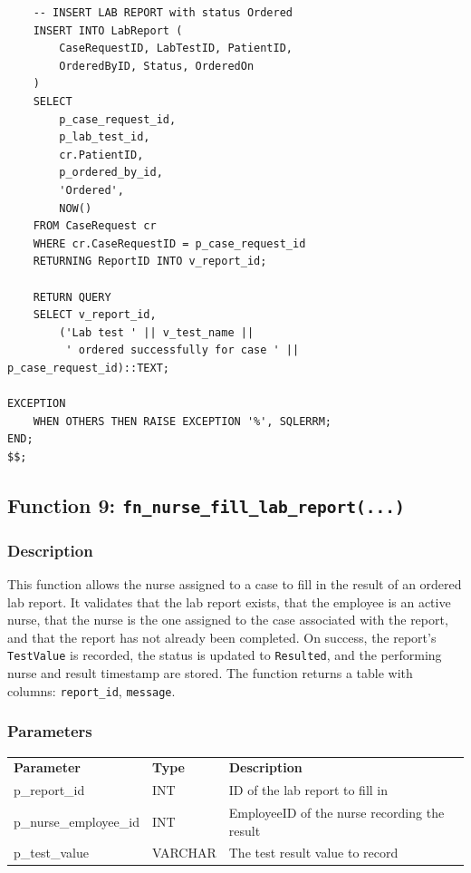\documentclass{article}
\newcommand{\theadcell}{\color{white}\bfseries}
\begin{document}
\begin{lstlisting}
    -- INSERT LAB REPORT with status Ordered
    INSERT INTO LabReport (
        CaseRequestID, LabTestID, PatientID,
        OrderedByID, Status, OrderedOn
    )
    SELECT
        p_case_request_id,
        p_lab_test_id,
        cr.PatientID,
        p_ordered_by_id,
        'Ordered',
        NOW()
    FROM CaseRequest cr
    WHERE cr.CaseRequestID = p_case_request_id
    RETURNING ReportID INTO v_report_id;

    RETURN QUERY
    SELECT v_report_id,
        ('Lab test ' || v_test_name ||
         ' ordered successfully for case ' || p_case_request_id)::TEXT;

EXCEPTION
    WHEN OTHERS THEN RAISE EXCEPTION '%', SQLERRM;
END;
$$;
\end{lstlisting}

\vspace{1em}

\subsection{Function 9: \texttt{fn\_nurse\_fill\_lab\_report(...)}}

\subsubsection{Description}
This function allows the nurse assigned to a case to fill in the result of an ordered lab report. It validates that the lab report exists, that the employee is an active nurse, that the nurse is the one assigned to the case associated with the report, and that the report has not already been completed. On success, the report's \texttt{TestValue} is recorded, the status is updated to \texttt{Resulted}, and the performing nurse and result timestamp are stored. The function returns a table with columns: \texttt{report\_id}, \texttt{message}.

\subsubsection{Parameters}

\begin{center}
\begin{tabular}{L{4.5cm} L{2.5cm} L{6.5cm}}
   \theadcell Parameter & \theadcell Type & \theadcell Description \\
   p\_report\_id         & INT     & ID of the lab report to fill in \\
   p\_nurse\_employee\_id & INT     & EmployeeID of the nurse recording the result \\
   p\_test\_value        & VARCHAR & The test result value to record \\
\end{tabular}
\end{center}
\end{document}
